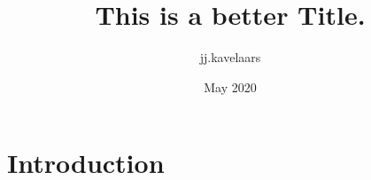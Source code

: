 \documentclass{article}
\title{This is a better Title.}
\author{jj.kavelaars }
\date{May 2020}
\begin{document}
\maketitle

\section{Introduction}
\end{document}
